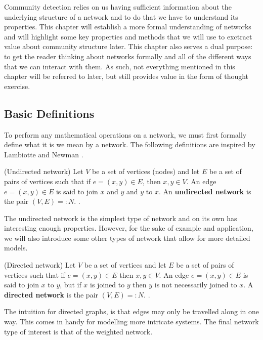 Community detection relies on us having sufficient information about the underlying structure of a network and to do that we have to understand its properties. This chapter will establish a more formal understanding of networks and will highlight some key properties and methods that we will use to exctract value about community structure later. This chapter also serves a dual purpose: to get the reader thinking about networks formally and all of the different ways that we can interact with them. As such, not everything mentioned in this chapter will be referred to later, but still provides value in the form of thought exercise.

\subsection{Basic Definitions}
To perform any mathematical operations on a network, we must first formally define what it is we mean by a network. The following definitions are inspired by Lambiotte \cite{oxford:renaud_notes} and Newman \cite{newman10}.

\begin{definition}{(Undirected network)}
    Let $V$ be a set of vertices (nodes) and let $E$ be a set of pairs of vertices such that if $e = (x, y) \in E$, then $x, y \in V$. An edge $e = (x, y) \in E$ is said to join $x$ and $y$ and $y$ to $x$. An \textbf{undirected network} is the pair $(V, E) =: N$. \label{def:undirected_network}.
\end{definition}

The undirected network is the simplest type of network and on its own has interesting enough properties. However, for the sake of example and application, we will also introduce some other types of network that allow for more detailed models.

\begin{definition}{(Directed network)}
    Let $V$ be a set of vertices and let $E$ be a set of pairs of vertices such that if $e = (x, y) \in E$ then $x, y \in V$. An edge $e = (x, y) \in E$ is said to join $x$ to $y$, but if $x$ is joined to $y$ then $y$ is not necessarily joined to $x$. A \textbf{directed network} is the pair $(V, E) =: N$. \label{def:directed_network}.
\end{definition}

The intuition for directed graphs, is that edges may only be travelled along in one way. This comes in handy for modelling more intricate systems. The final network type of interest is that of the weighted network.

